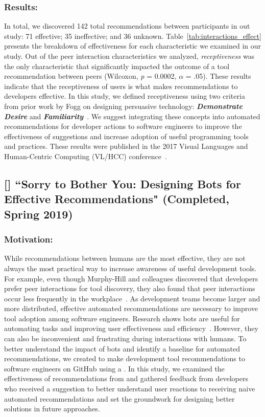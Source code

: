 \subsubsection{Results:}

In total, we discovered 142 total recommendations between participants in out study: 71 effective; 35 ineffective; and 36 unknown. Table~\ref{tab:interactions_effect} presents the breakdown of effectiveness for each characteristic we examined in our study. Out of the peer interaction characteristics we analyzed, \textit{receptiveness} was the only characteristic that significantly impacted the outcome of a tool recommendation between peers (Wilcoxon, \textit{p} = 0.0002, $\alpha$ = .05). These results indicate that the receptiveness of users is what makes recommendations to developers effective. In this study, we defined receptiveness using two criteria from prior work by Fogg on designing persuasive technology: \textit{\textbf{Demonstrate Desire}} and \textit{\textbf{Familiarity}}~\cite{Fogg2009Persuasive}. We suggest integrating these concepts into automated recommendations for developer actions to software engineers to improve the effectiveness of suggestions and increase adoption of useful programming tools and practices. These results were published in the 2017 Visual Languages and Human-Centric Computing (VL/HCC) conference~\cite{VLHCC}.


\subsection{[\sorryT] ``Sorry to Bother You: Designing Bots for
Effective Recommendations" (Completed, Spring 2019)}

\subsubsection{Motivation:}

While recommendations between humans are the most effective, they are not always the most practical way to increase awareness of useful development tools. For example, even though Murphy-Hill and colleagues discovered that developers prefer peer interactions for tool discovery, they also found that peer interactions occur less frequently in the workplace~\cite{Murphy-Hill2011PeerInteraction}. As development teams become larger and more distributed, effective automated recommendations are necessary to improve tool adoption among software engineers. Research shows bots are useful for automating tasks and improving user effectiveness and efficiency~\cite{StoreyBots}. However, they can also be inconvenient and frustrating during interactions with humans. To better understand the impact of bots and identify a baseline for automated recommendations, we created \tool to make development tool recommendations to software engineers on GitHub using a \tele. In this study, we examined the effectiveness of recommendations from \tool and gathered feedback from developers who received a suggestion to better understand user reactions to receiving naive automated recommendations and set the groundwork for designing better solutions in future approaches.


